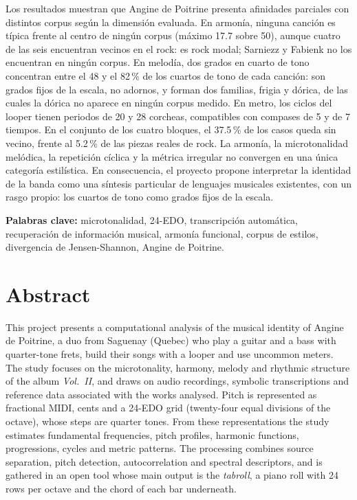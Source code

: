 Los resultados muestran que Angine de Poitrine presenta afinidades parciales con distintos corpus según la dimensión
evaluada. En armonía, ninguna canción es típica frente al centro de ningún corpus (máximo 17.7 sobre 50), aunque
cuatro de las seis encuentran vecinos en el rock: es rock modal; Sarniezz y Fabienk no los encuentran en ningún corpus. En melodía, dos grados en
cuarto de tono concentran entre el 48 y el 82\,\% de los cuartos de tono de cada canción: son grados fijos de la escala,
no adornos, y forman dos familias, frigia y dórica, de las cuales la dórica no aparece en ningún corpus medido. En
metro, los ciclos del looper tienen periodos de 20 y 28 corcheas, compatibles con compases de 5 y de 7 tiempos. En el
conjunto de los cuatro bloques, el 37.5\,\% de los casos queda sin vecino, frente al 5.2\,\% de las piezas reales de
rock. La armonía, la microtonalidad melódica, la repetición cíclica y la métrica irregular no convergen en una única
categoría estilística. En consecuencia, el proyecto propone interpretar la identidad de la banda como una síntesis
particular de lenguajes musicales existentes, con un rasgo propio: los cuartos de tono como grados fijos de la escala.

\medskip
\noindent\textbf{Palabras clave:} microtonalidad, 24-EDO, transcripción automática, recuperación de información musical,
armonía funcional, corpus de estilos, divergencia de Jensen-Shannon, Angine de Poitrine.

\chapter*{Abstract}

This project presents a computational analysis of the musical identity of Angine de Poitrine, a duo from Saguenay
(Quebec) who play a guitar and a bass with quarter-tone frets, build their songs with a looper and use uncommon meters.
The study focuses on the microtonality, harmony, melody and rhythmic structure of the album \emph{Vol.~II}, and draws on
audio recordings, symbolic transcriptions and reference data associated with the works analysed. Pitch is represented as
fractional MIDI, cents and a 24-EDO grid (twenty-four equal divisions of the octave), whose steps are quarter tones. From
these representations the study estimates fundamental frequencies, pitch profiles, harmonic functions, progressions,
cycles and metric patterns. The processing combines source separation, pitch detection, autocorrelation and spectral
descriptors, and is gathered in an open tool whose main output is the \emph{tabroll}, a piano roll with 24 rows per
octave and the chord of each bar underneath.

